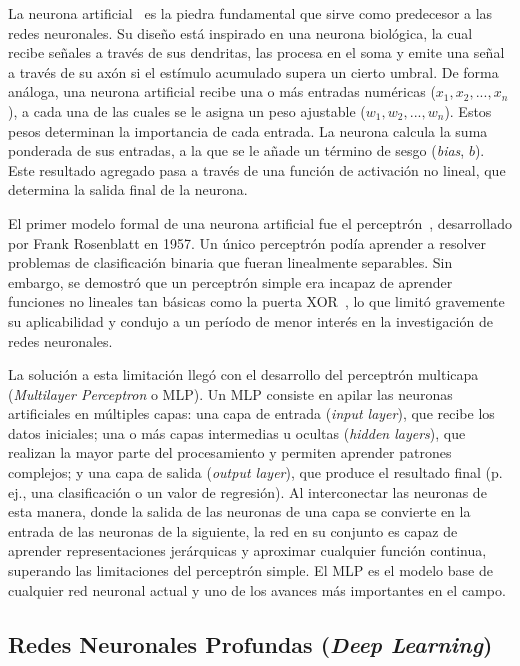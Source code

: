 La neurona artificial~\cite{mcculloch1943logical} es la piedra fundamental que sirve como predecesor a las redes neuronales. Su diseño está inspirado en una neurona biológica, la cual recibe señales a través de sus dendritas, las procesa en el soma y emite una señal a través de su axón si el estímulo acumulado supera un cierto umbral. De forma análoga, una neurona artificial recibe una o más entradas numéricas ($x_1, x_2, ..., x_n$), a cada una de las cuales se le asigna un peso ajustable ($w_1, w_2, ..., w_n$). Estos pesos determinan la importancia de cada entrada. La neurona calcula la suma ponderada de sus entradas, a la que se le añade un término de sesgo (\textit{bias}, $b$). Este resultado agregado pasa a través de una función de activación no lineal, que determina la salida final de la neurona.

El primer modelo formal de una neurona artificial fue el perceptrón~\cite{rosenblatt1958perceptron}, desarrollado por Frank Rosenblatt en 1957. Un único perceptrón podía aprender a resolver problemas de clasificación binaria que fueran linealmente separables. Sin embargo, se demostró que un perceptrón simple era incapaz de aprender funciones no lineales tan básicas como la puerta XOR~\cite{minsky2017perceptrons}, lo que limitó gravemente su aplicabilidad y condujo a un período de menor interés en la investigación de redes neuronales.

La solución a esta limitación llegó con el desarrollo del perceptrón multicapa (\textit{Multilayer Perceptron} o MLP). Un MLP consiste en apilar las neuronas artificiales en múltiples capas: una capa de entrada (\textit{input layer}), que recibe los datos iniciales; una o más capas intermedias u ocultas (\textit{hidden layers}), que realizan la mayor parte del procesamiento y permiten aprender patrones complejos; y una capa de salida (\textit{output layer}), que produce el resultado final (p. ej., una clasificación o un valor de regresión). Al interconectar las neuronas de esta manera, donde la salida de las neuronas de una capa se convierte en la entrada de las neuronas de la siguiente, la red en su conjunto es capaz de aprender representaciones jerárquicas y aproximar cualquier función continua, superando las limitaciones del perceptrón simple. El MLP es el modelo base de cualquier red neuronal actual y uno de los avances más importantes en el campo.

\subsection{Redes Neuronales Profundas (\textit{Deep Learning})}

